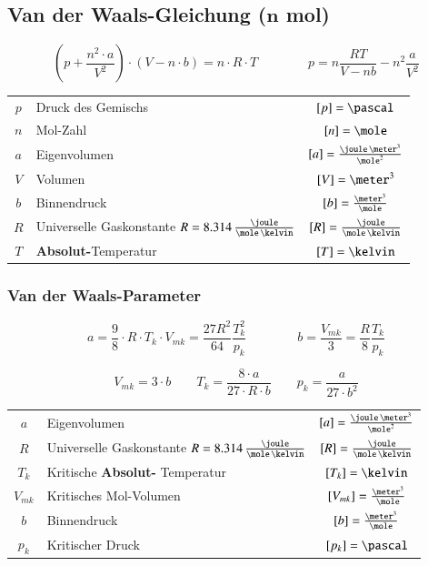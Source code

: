 \subsection[Van der Waals-Gleichung (n Mol)]{Van der Waals-Gleichung ($\bm{n}$ mol)}

\vspace{-0.2cm}

$$ \boxed{ \left( p + \frac{n^2 \cdot a}{V^2} \right)  \cdot (V - n \cdot b) = n \cdot R 
\cdot T } \qquad \qquad \boxed{p = n\frac{RT}{V-nb} - n^2 \frac{a}{V^2}}$$

\renewcommand{\arraystretch}{1.3}
\begin{tabular}{c l c}
	$p$ & Druck des Gemischs 															& $[p] = \pascal$ 								\\
	$n$ & Mol-Zahl 																		& $[n] = \mole$ 								\\
	$a$ & Eigenvolumen 																	& $[a] = \frac{\joule \, \meter^3}{\mole^2}$ 	\\
	$V$ & Volumen 																		& $[V] = \meter^3$ 								\\
	$b$ & Binnendruck 																	& $[b] = \frac{\meter^3}{\mole}$ 				\\
	$R$	& Universelle Gaskonstante $R = 8.314 \, \frac{\joule}{\mole \, \kelvin}$ 		& $[R] = \frac{\joule}{\mole \, \kelvin}$ 		\\
	$T$ & \textbf{Absolut-}Temperatur 													& $[T] = \kelvin$
\end{tabular}
\renewcommand{\arraystretch}{1}


\subsubsection{Van der Waals-Parameter}

\vspace{-0.2cm}
\[\boxed{ a = \frac{9}{8} \cdot R \cdot T_k \cdot V_{mk}  = \frac{27 R^2}{64} \frac{T_k^2}{p_k}} 
\qquad \qquad  \boxed{ b = \frac{V_{mk}}{3} = \frac{R}{8} \frac{T_k}{p_k}}\]

\[\boxed{ V_{mk} = 3 \cdot b } \quad \quad 
\boxed{ T_k = \frac{8 \cdot a}{27 \cdot R \cdot b} } 
\quad \quad  \boxed{ p_k = \frac{a}{27 \cdot b^2} } \]


\renewcommand{\arraystretch}{1.3}
\begin{tabular}{c l c}
	$a$ 		& Eigenvolumen 																	& $[a] = \frac{\joule \, \meter^3}{\mole^2}$ 	\\
	$R$			& Universelle Gaskonstante $R = 8.314 \, \frac{\joule}{\mole \, \kelvin}$ 		& $[R] = \frac{\joule}{\mole \, \kelvin}$ 		\\
	$T_k$ 		& Kritische \textbf{Absolut-} Temperatur 										& $[T_k] = \kelvin$ 							\\
	$V_{mk}$ 	& Kritisches Mol-Volumen 														& $[V_{mk}] = \frac{\meter^3}{\mole}$ 			\\
	$b$ 		& Binnendruck 																	& $[b] = \frac{\meter^3}{\mole}$ 				\\
	$p_k$ 		& Kritischer Druck 																& $[p_k] = \pascal$
\end{tabular}
\renewcommand{\arraystretch}{1}

